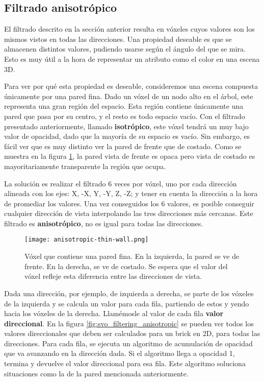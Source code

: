 
\subsection{Filtrado anisotrópico}

El filtrado descrito en la sección anterior resulta en vóxeles cuyos valores son los mismos vistos en todas las direcciones.
Una propiedad deseable es que se almacenen distintos valores, pudiendo usarse según el ángulo del que se mira.
Esto es muy útil a la hora de representar un atributo como el color en una escena 3D.

Para ver por qué esta propiedad es deseable, consideremos una escena compuesta únicamente por una pared fina.
Dado un vóxel de un nodo alto en el árbol, este representa una gran región del espacio.
Esta región contiene únicamente una pared que pasa por su centro, y el resto es todo espacio vacío.
Con el filtrado presentado anteriormente, llamado \textbf{isotrópico}, este vóxel tendrá un muy bajo valor de opacidad, dado que la mayoría de su espacio es vacío.
Sin embargo, es fácil ver que es muy distinto ver la pared de frente que de costado.
Como se muestra en la figura \ref{fig:anisotropic-thin-wall}, la pared vista de frente es opaca pero vista de costado es mayoritariamente transparente la región que ocupa.

La solución es realizar el filtrado 6 veces por vóxel, uno por cada dirección alineada con los ejes: X, -X, Y, -Y, Z, -Z; y tener en cuenta la dirección a la hora de promediar los valores.
Una vez conseguidos los 6 valores, es posible conseguir cualquier dirección de vista interpolando las tres direcciones más cercanas.
Este filtrado es \textbf{anisotrópico}, no es igual para todas las direcciones.

\begin{figure}
    \centering
    \texttt{[image: anisotropic-thin-wall.png]}
    \caption{
        Vóxel que contiene una pared fina.
        En la izquierda, la pared se ve de frente.
        En la derecha, se ve de costado.
        Se espera que el valor del vóxel refleje esta diferencia entre las direcciones de vista.
    }
    \label{fig:anisotropic-thin-wall}
\end{figure}

Dada una dirección, por ejemplo, de izquierda a derecha, se parte de los vóxeles de la izquierda y se calcula un valor para cada fila, partiendo de estos y yendo hacia los vóxeles de la derecha.
Llamémosle al valor de cada fila \textbf{valor direccional}.
En la figura \ref{fig:svo_filtering_anisotropic} se pueden ver todos los valores direccionales que deben ser calculados para un brick en 2D, para todas las direcciones.
Para cada fila, se ejecuta un algoritmo de acumulación de opacidad que va avanzando en la dirección dada.
Si el algoritmo llega a opacidad 1, termina y devuelve el valor direccional para esa fila.
Este algoritmo soluciona situaciones como la de la pared mencionada anteriormente.

